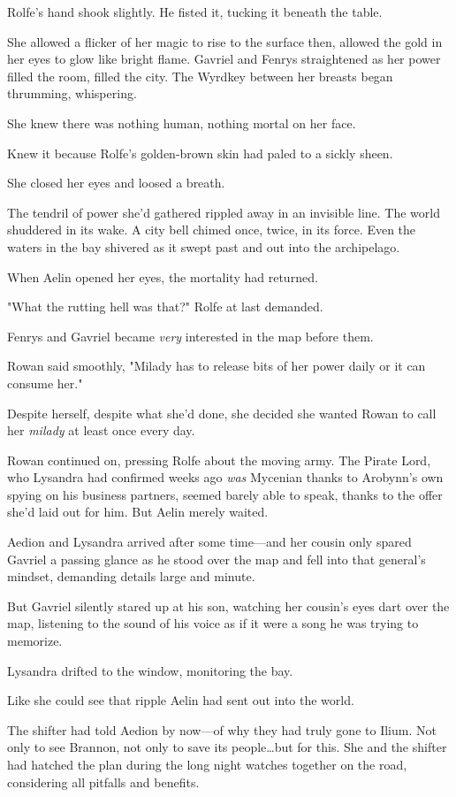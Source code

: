 Rolfe's hand shook slightly.
He fisted it, tucking it beneath the table.

She allowed a flicker of her magic to rise to the surface then, allowed the gold in her eyes to glow like bright flame.
Gavriel and Fenrys straightened as her power filled the room, filled the city.
The Wyrdkey between her breasts began thrumming, whispering.

She knew there was nothing human, nothing mortal on her face.

Knew it because Rolfe's golden-brown skin had paled to a sickly sheen.

She closed her eyes and loosed a breath.

The tendril of power she'd gathered rippled away in an invisible line.
The world shuddered in its wake.
A city bell chimed once, twice, in its force.
Even the waters in the bay shivered as it swept past and out into the archipelago.

When Aelin opened her eyes, the mortality had returned.

"What the rutting hell was that?"
Rolfe at last demanded.

Fenrys and Gavriel became \emph{very} interested in the map before them.

Rowan said smoothly, "Milady has to release bits of her power daily or it can consume her."

Despite herself, despite what she'd done, she decided she wanted Rowan to call her \emph{milady} at least once every day.

Rowan continued on, pressing Rolfe about the moving army.
The Pirate Lord, who Lysandra had confirmed weeks ago \emph{was} Mycenian thanks to Arobynn's own spying on his business partners, seemed barely able to speak, thanks to the offer she'd laid out for him.
But Aelin merely waited.

Aedion and Lysandra arrived after some time---and her cousin only spared Gavriel a passing glance as he stood over the map and fell into that general's mindset, demanding details large and minute.

But Gavriel silently stared up at his son, watching her cousin's eyes dart over the map, listening to the sound of his voice as if it were a song he was trying to memorize.

Lysandra drifted to the window, monitoring the bay.

Like she could see that ripple Aelin had sent out into the world.

The shifter had told Aedion by now---of why they had truly gone to Ilium.
Not only to see Brannon, not only to save its people\ldots but for this.
She and the shifter had hatched the plan during the long night watches together on the road, considering all pitfalls and benefits.

